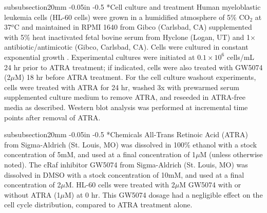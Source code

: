 \documentclass[12pt]{article}
\makeatletter
\renewcommand\subsubsection{\@startsection
	{subsubsection}{2}{0mm}
	{-0.05in}
	{-0.5\baselineskip}
	{\normalfont\normalsize\itshape}}
\makeatother
\begin{document}






\subsubsection*{Cell culture and treatment}
Human myeloblastic leukemia cells (HL-60 cells) were grown in a humidified atmosphere of 5\% CO$_2$ at 37$^{o}$C and maintained in RPMI 1640 from Gibco (Carlsbad, CA)
supplemented with 5\% heat inactivated fetal bovine serum from Hyclone (Logan, UT) and 1$\times$ antibiotic/antimicotic (Gibco, Carlsbad, CA).
Cells were cultured in constant exponential growth \cite{Brooks1996}.
Experimental cultures were initiated at $0.1\times10^6$ cells/mL 24 hr prior to ATRA treatment;
if indicated, cells were also treated with GW5074 (2$\mu$M) 18 hr before ATRA treatment.
For the cell culture washout experiments, cells were treated with ATRA for 24 hr,
washed 3x with prewarmed serum supplemented culture medium to remove ATRA,
and reseeded in ATRA-free media as described.
Western blot analysis was performed at incremental time points after removal of ATRA.

\subsubsection*{Chemicals}
All-Trans Retinoic Acid (ATRA) from Sigma-Aldrich (St. Louis, MO) was dissolved in
100\% ethanol with a stock concentration of 5mM, and used at a final concentration of 1$\mu$M (unless otherwise noted).
The cRaf inhibitor GW5074 from Sigma-Aldrich (St. Louis, MO) was dissolved in DMSO with a stock concentration of 10mM,
and used at a final concentration of 2$\mu$M.
HL-60 cells were treated with 2$\mu$M GW5074 with or without ATRA (1$\mu$M) at 0 hr.
This GW5074 dosage had a negligible effect on the cell cycle distribution, compared to ATRA treatment alone.
\end{document}
